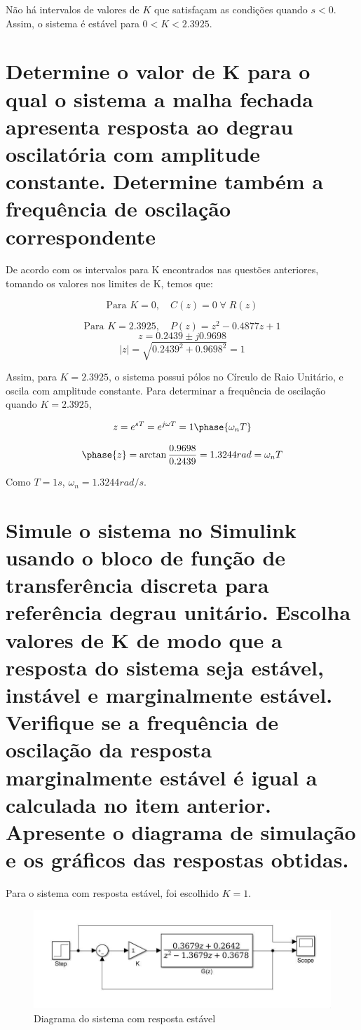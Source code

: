 \documentclass{article}
\begin{document}
    {Não há intervalos de valores de $K$ que satisfaçam as condições quando $s < 0$.}\\

    {Assim, o sistema é estável para $ 0 < K < 2.3925 $.}


\section{Determine o valor de K para o qual o sistema a malha fechada apresenta
    resposta ao degrau oscilatória com amplitude constante. Determine também a
    frequência de oscilação correspondente
}

    {De acordo com os intervalos para K encontrados nas questões anteriores,
    tomando os valores nos limites de K, temos que:}

    \[ \text{Para } K = 0, \quad C(z) = 0 \; \forall \; R(z) \]

    \[ \text{Para } K = 2.3925, \quad P(z) = z^2 - 0.4877z + 1 \]
    \[    z = 0.2439 \pm j 0.9698 \]
    \[    |z| = \sqrt{0.2439^2 + 0.9698^2} = 1 \]

    {Assim, para $ K = 2.3925 $, o sistema possui pólos no Círculo de Raio
    Unitário, e oscila com amplitude constante. Para determinar a frequência de
    oscilação quando $ K = 2.3925 $,}

    \[ z = e^{s T} = e^{j \omega T} = 1 \phase{\omega_n T} \]

    \[ \phase{z} = \arctan \frac{0.9698}{0.2439} = 1.3244 rad = \omega_n T \]

    {Como $ T = 1s $, $ \omega_n = 1.3244 rad/s $.}


\section{Simule o sistema no Simulink usando o bloco de função de transferência
    discreta para referência degrau unitário. Escolha valores de K de modo que
    a resposta do sistema seja estável, instável e marginalmente estável.
    Verifique se a frequência de oscilação da resposta marginalmente estável é
    igual a calculada no item anterior. Apresente o diagrama de simulação e os
    gráficos das respostas obtidas.
}

    {Para o sistema com resposta estável, foi escolhido $K = 1$.}

\begin{figure}[H]
    \centering
        \includegraphics[width=.8\linewidth]{images/Simulink_diagram_stable.jpg}
        \caption{Diagrama do sistema com resposta estável}\label{fig:diagram_stable}
\end{figure}
\end{document}
